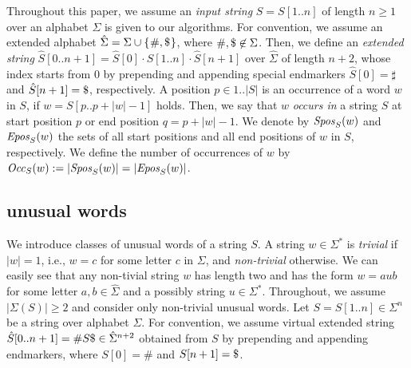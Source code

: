 Throughout this paper, we assume an \textit{input string} $S = S[1..n]$ of length $n\ge 1$ over an alphabet $\Sigma$ is given to our algorithms. For convention, we assume an extended alphabet $\hat\Sigma = \Sigma\cup\{\kern0.05em\#, \$\kern0.05em\}$, where $\#, \$ \not \in \Sigma$. Then, we define an \textit{extended string} $\hat S[0..n+1] = \hat S[0]\cdot S[1..n]\cdot \hat S[n+1]$  over $\hat \Sigma$ of length $n+2$, whose index starts from $0$ by prepending and appending special endmarkers $\hat S[0] = \sharp$ and $\hat S[n+1] = \daller$, respectively. 
A position $p \in 1..|S|$ is an occurrence of a word $w$ in $S$, if $w = S[p..p+|w|-1]$ holds. Then, we say that $w$ \textit{occurs in} a string $S$ at start position $p$ or end position $q = p + |w| - 1$. 
We denote by $\mathit{Spos}_{S}(w)$ and $\mathit{Epos}_{S}(w)$ the sets of all start positions and all end positions of $w$ in $S$, respectively. 
We define the number of occurrences of $w$ by $\mathit{Occ}_{S}(w) := |\mathit{Spos}_{S}(w)| = |\mathit{Epos}_{S}(w)|$. 

\subsection{unusual words}
\label{sec:unusual}
We introduce classes of unusual words of a string $S$.
A string $w \in \Sigma^*$ is \textit{trivial} if $|w| = 1$, i.e., $w = c$ for some letter $c$ in $\Sigma$, and \textit{non-trivial} otherwise.
We can easily see that any non-tivial string $w$ has length two and has the form $w = aub$ for some letter $a, b \in \hat\Sigma$ and a possibly string $u \in \Sigma^*$. Throughout, we assume $|\Sigma(S)|\ge 2$ and consider only non-trivial unusual words.
Let $S = S[1..n] \in \Sigma^n$ be a string over alphabet $\Sigma$.
For convention, we assume virtual extended string $\hat S[0..n+1] = \# S\$ \in \hat\Sigma^{n+2}$ obtained from $S$ by prepending and appending endmarkers, where $S[0] = \#$ and $S[n+1] = \daller$.



